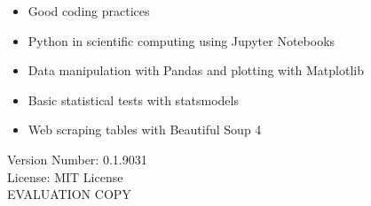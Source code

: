 \documentclass{book}
\newcommand{\booklicense}{MIT License}
\newcommand{\bookversion}{0.1.9031}
\begin{document}
\begin{titlepage}
\begin{flushleft}
\begin{tcolorbox}[skin = widget, boxrule = 1mm, coltitle = white, colframe = white, colback = white, width=(\textwidth), before=\hfill, after=\hfill]
\begin{itemize}
    \item Good coding practices
    \item Python in scientific computing using Jupyter Notebooks
    \item Data manipulation with Pandas and plotting with Matplotlib
    \item Basic statistical tests with statsmodels
    \item Web scraping tables with Beautiful Soup 4
\end{itemize}
\vspace{5mm}
Version Number: \bookversion\\
License: \booklicense\\
EVALUATION COPY
\vspace{3cm}
\end{tcolorbox}
\end{flushleft}
\end{titlepage}
\restoregeometry
\end{document}
